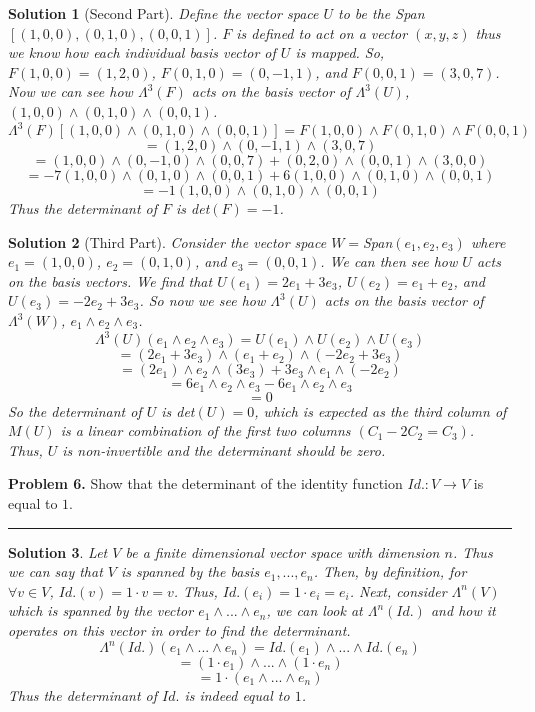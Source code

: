 \documentclass[leqno]{article}
\theoremstyle{nonumberplain}
\newtheorem{solution}{Solution}
\begin{document}
\begin{solution}[Second Part]
Define the vector space $U$ to be the Span$[(1,0,0),(0,1,0),(0,0,1)]$. $F$ is defined to act on a vector $(x,y,z)$ thus we know how each individual basis vector of $U$ is mapped. So, $F(1,0,0)=(1,2,0)$, $F(0,1,0)=(0,-1,1)$, and $F(0,0,1)=(3,0,7)$.  Now we can see how $\Lambda^3(F)$ acts on the basis vector of $\Lambda^3(U)$, $(1,0,0) \wedge (0,1,0) \wedge (0,0,1)$.
\[
\Lambda^3(F)[(1,0,0) \wedge (0,1,0) \wedge (0,0,1)]=F(1,0,0) \wedge F(0,1,0) \wedge F(0,0,1)
\]
\[
=(1,2,0) \wedge (0,-1,1) \wedge (3,0,7)
\]
\[
=(1,0,0) \wedge (0,-1,0) \wedge (0,0,7) + (0,2,0) \wedge (0,0,1) \wedge (3,0,0)
\]
\[
=-7(1,0,0) \wedge (0,1,0) \wedge (0,0,1) + 6(1,0,0) \wedge (0,1,0) \wedge (0,0,1)
\]
\[
=-1(1,0,0)\wedge (0,1,0) \wedge (0,0,1)
\]
Thus the determinant of $F$ is det$(F)=-1$.

\end{solution}

\begin{solution}[Third Part]
Consider the vector space $W =$Span$(e_1,e_2,e_3)$ where $e_1=(1,0,0)$, $e_2=(0,1,0)$, and $e_3=(0,0,1)$.  We can then see how $U$ acts on the basis vectors.  We find that $U(e_1)=2e_1+3e_3$, $U(e_2)=e_1+e_2$, and $U(e_3)=-2e_2+3e_3$.  So now we see how $\Lambda^3(U)$ acts on the basis vector of $\Lambda^3(W)$, $e_1 \wedge e_2 \wedge e_3$.  
\[
\Lambda^3(U)(e_1 \wedge e_2 \wedge e_3)=U(e_1) \wedge U(e_2) \wedge U(e_3)
\]
\[
=(2e_1+3e_3) \wedge (e_1 + e_2) \wedge (-2e_2+3e_3)
\]
\[
=(2e_1) \wedge e_2 \wedge (3e_3) + 3e_3 \wedge e_1 \wedge (-2e_2)
\]
\[
=6e_1 \wedge e_2 \wedge e_3 - 6e_1 \wedge e_2 \wedge e_3
\]
\[
=0
\]
So the determinant of $U$ is det$(U)=0$, which is expected as the third column of $M(U)$ is a linear combination of the first two columns $(C_1-2C_2=C_3)$.  Thus, $U$ is non-invertible and the determinant should be zero.
\end{solution}
\pagebreak

\noindent \textbf{Problem 6.} Show that the determinant of the identity function $Id. : V \rightarrow V$ is equal to $1$.

\noindent\rule[0.5ex]{\linewidth}{1pt}
\begin{solution}
Let $V$ be a finite dimensional vector space with dimension $n$.  Thus we can say that $V$ is spanned by the basis $e_1,...,e_n$.  Then, by definition, for $\forall v \in V$, $Id.(v)=1 \cdot v = v$.  Thus, $Id.(e_i)=1 \cdot e_i = e_i$.  Next, consider $\Lambda^n(V)$ which is spanned by the vector $e_1 \wedge ... \wedge e_n$, we can look at $\Lambda^n(Id.)$ and how it operates on this vector in order to find the determinant.
\[
\Lambda^n(Id.)(e_1 \wedge ... \wedge e_n)= Id.(e_1) \wedge ... \wedge Id.(e_n)
\]
\[
=(1 \cdot e_1) \wedge ... \wedge (1\cdot e_n)
\]
\[
=1 \cdot (e_1 \wedge ... \wedge e_n)
\]
Thus the determinant of $Id.$ is indeed equal to $1$.
\end{solution}
\pagebreak
\end{document}
